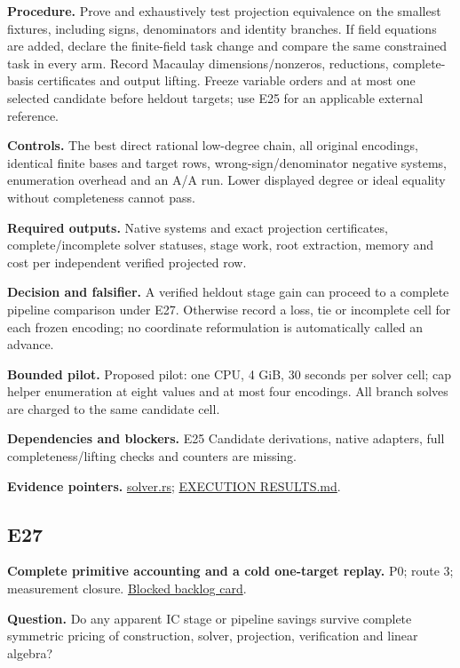 \documentclass[
  10pt,
]{article}
\begin{document}
\textbf{Procedure.} Prove and exhaustively test projection equivalence
on the smallest fixtures, including signs, denominators and identity
branches. If field equations are added, declare the finite-field task
change and compare the same constrained task in every arm. Record
Macaulay dimensions/nonzeros, reductions, complete-basis certificates
and output lifting. Freeze variable orders and at most one selected
candidate before heldout targets; use E25 for an applicable external
reference.

\textbf{Controls.} The best direct rational low-degree chain, all
original encodings, identical finite bases and target rows,
wrong-sign/denominator negative systems, enumeration overhead and an A/A
run. Lower displayed degree or ideal equality without completeness
cannot pass.

\textbf{Required outputs.} Native systems and exact projection
certificates, complete/incomplete solver statuses, stage work, root
extraction, memory and cost per independent verified projected row.

\textbf{Decision and falsifier.} A verified heldout stage gain can
proceed to a complete pipeline comparison under E27. Otherwise record a
loss, tie or incomplete cell for each frozen encoding; no coordinate
reformulation is automatically called an advance.

\textbf{Bounded pilot.} Proposed pilot: one CPU, 4 GiB, 30 seconds per
solver cell; cap helper enumeration at eight values and at most four
encodings. All branch solves are charged to the same candidate cell.

\textbf{Dependencies and blockers.} E25 Candidate derivations, native
adapters, full completeness/lifting checks and counters are missing.

\textbf{Evidence pointers.}
\href{../../../research/twist_routes_1_3_20261021/runner/src/solver.rs}{solver.rs};
\href{../../../research/twist_routes_1_3_20261021/reports/EXECUTION_RESULTS.md}{EXECUTION
RESULTS.md}.

\subsection{E27}\label{e27}

\textbf{Complete primitive accounting and a cold one-target replay.} P0;
route 3; measurement closure.
\href{../../../backlog/XP-20261022-twist-complete-cost-accounting/README.md}{Blocked
backlog card}.

\textbf{Question.} Do any apparent IC stage or pipeline savings survive
complete symmetric pricing of construction, solver, projection,
verification and linear algebra?
\end{document}
